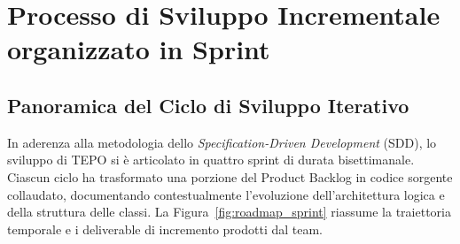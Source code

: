 \section{Processo di Sviluppo Incrementale organizzato in Sprint}
\label{sec:processo_sviluppo_sprint}

\subsection{Panoramica del Ciclo di Sviluppo Iterativo}
In aderenza alla metodologia dello \emph{Specification-Driven Development} (SDD), lo sviluppo di TEPO si è articolato in quattro sprint di durata bisettimanale. Ciascun ciclo ha trasformato una porzione del Product Backlog in codice sorgente collaudato, documentando contestualmente l'evoluzione dell'architettura logica e della struttura delle classi.
La Figura~\ref{fig:roadmap_sprint} riassume la traiettoria temporale e i deliverable di incremento prodotti dal team.

